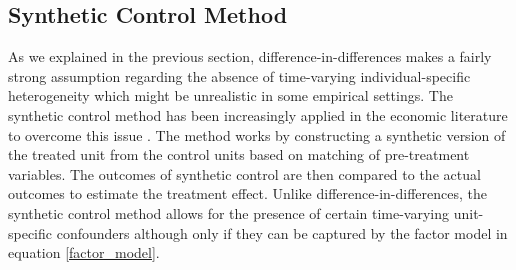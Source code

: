 \subsection{Synthetic Control Method} \label{subsec:sc_methodology}
As we explained in the previous section, difference-in-differences makes a fairly strong assumption regarding the absence of time-varying individual-specific heterogeneity which might be unrealistic in some empirical settings.
The synthetic control method has been increasingly applied in the economic literature to overcome this issue \citep{abadie_economic_2003, abadie_synthetic_2010, billmeier_assessing_2013, cavallo_catastrophic_2013}. The method works by constructing a synthetic version of the treated unit from the control units  based on matching of pre-treatment variables. The outcomes of synthetic control are then compared to the actual outcomes  to estimate the treatment effect.
Unlike difference-in-differences, the synthetic control method allows for the presence of certain time-varying unit-specific confounders although only if they can be  captured by the factor model in equation \ref{factor_model}.




